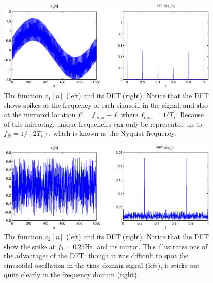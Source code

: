 \begin{figure}[h!]
    \centering
    \includegraphics[scale=0.6]{./img/sins.eps}
    \caption{The function $x_1[n]$ (left) and its DFT (right). Notice that the DFT shows spikes at the frequency of each sinusoid in the signal, and also at the mirrored location $f'=f_{max}-f$, where $f_{max}=1/T_s$. Because of this mirroring, unique frequencies can only be represented up to $f_N=1/(2T_s)$, which is known as the Nyquist frequency.}
\end{figure}
\begin{figure}[h!]
    \centering
    \includegraphics[scale=0.6]{./img/random.eps}
    \caption{The function $x_2[n]$ (left) and its DFT (right). Notice that the DFT show the spike at $f_0=0.25$Hz, and its mirror. This illustrates one of the advantages of the DFT: though it was difficult to spot the sinusoidal oscillation in the time-domain signal (left), it sticks out quite clearly in the frequency domain (right).}
\end{figure}